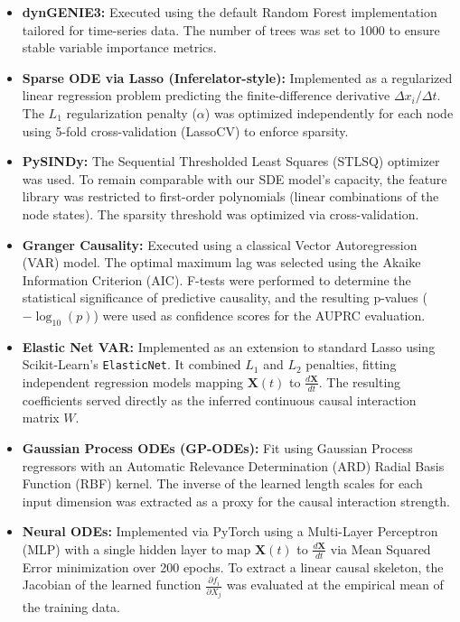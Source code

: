 \documentclass[11pt,onecolumn]{article}
\theoremstyle{definition}
\theoremstyle{remark}
\begin{document}
\begin{itemize}
    \item \textbf{dynGENIE3:} Executed using the default Random Forest implementation tailored for time-series data. The number of trees was set to 1000 to ensure stable variable importance metrics.
    \item \textbf{Sparse ODE via Lasso (Inferelator-style):} Implemented as a regularized linear regression problem predicting the finite-difference derivative $\Delta x_i / \Delta t$. The $L_1$ regularization penalty ($\alpha$) was optimized independently for each node using 5-fold cross-validation (LassoCV) to enforce sparsity.
    \item \textbf{PySINDy:} The Sequential Thresholded Least Squares (STLSQ) optimizer was used. To remain comparable with our SDE model's capacity, the feature library was restricted to first-order polynomials (linear combinations of the node states). The sparsity threshold was optimized via cross-validation.
    \item \textbf{Granger Causality:} Executed using a classical Vector Autoregression (VAR) model. The optimal maximum lag was selected using the Akaike Information Criterion (AIC). F-tests were performed to determine the statistical significance of predictive causality, and the resulting p-values ($- \log_{10}(p)$) were used as confidence scores for the AUPRC evaluation.
    \item \textbf{Elastic Net VAR:} Implemented as an extension to standard Lasso using Scikit-Learn's \texttt{ElasticNet}. It combined $L_1$ and $L_2$ penalties, fitting independent regression models mapping $\mathbf{X}(t)$ to $\frac{d\mathbf{X}}{dt}$. The resulting coefficients served directly as the inferred continuous causal interaction matrix $W$.
    \item \textbf{Gaussian Process ODEs (GP-ODEs):} Fit using Gaussian Process regressors with an Automatic Relevance Determination (ARD) Radial Basis Function (RBF) kernel. The inverse of the learned length scales for each input dimension was extracted as a proxy for the causal interaction strength.
    \item \textbf{Neural ODEs:} Implemented via PyTorch using a Multi-Layer Perceptron (MLP) with a single hidden layer to map $\mathbf{X}(t)$ to $\frac{d\mathbf{X}}{dt}$ via Mean Squared Error minimization over 200 epochs. To extract a linear causal skeleton, the Jacobian of the learned function $\frac{\partial f_i}{\partial X_j}$ was evaluated at the empirical mean of the training data.

\end{itemize}
\end{document}
